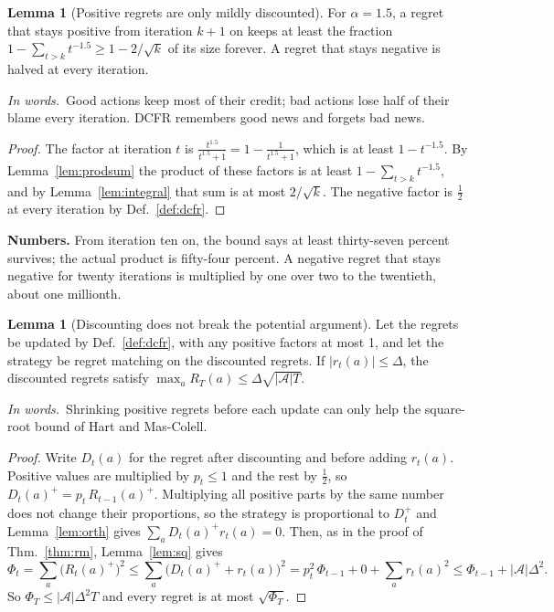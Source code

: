 \documentclass[11pt]{article}
\theoremstyle{definition}
\newtheorem{lemma}[definition]{Lemma}
\newcommand{\inwords}{\par\smallskip\noindent\textit{In words.}\ }
\newcommand{\Def}[1]{Def.~\ref{#1}}\newcommand{\Lem}[1]{Lemma~\ref{#1}}\newcommand{\Thm}[1]{Thm.~\ref{#1}}
\begin{document}
\begin{lemma}[Positive regrets are only mildly discounted]\label{lem:retain}
For $\alpha=1.5$, a regret that stays positive from iteration $k+1$ on keeps at least the fraction
$1-\sum_{t>k}t^{-1.5}\ge1-2/\sqrt k$ of its size forever. A regret that stays negative is halved at every iteration.
\inwords Good actions keep most of their credit; bad actions lose half of their blame every iteration. DCFR remembers
good news and forgets bad news.
\end{lemma}
\begin{proof}
The factor at iteration $t$ is $\frac{t^{1.5}}{t^{1.5}+1}=1-\frac1{t^{1.5}+1}$, which is at least $1-t^{-1.5}$. By
\Lem{lem:prodsum} the product of these factors is at least $1-\sum_{t>k}t^{-1.5}$, and by \Lem{lem:integral} that sum is
at most $2/\sqrt k$. The negative factor is $\tfrac12$ at every iteration by \Def{def:dcfr}.
\end{proof}
\textbf{Numbers.} From iteration ten on, the bound says at least thirty-seven percent survives; the actual product is
fifty-four percent. A negative regret that stays negative for twenty iterations is multiplied by one over two to the
twentieth, about one millionth.

\begin{lemma}[Discounting does not break the potential argument]\label{lem:dpot}
Let the regrets be updated by \Def{def:dcfr}, with any positive factors at most 1, and let the strategy be regret matching
on the discounted regrets. If $|r_t(a)|\le\Delta$, the discounted regrets satisfy $\max_aR_T(a)\le\Delta\sqrt{|\mathcal A|T}$.
\inwords Shrinking positive regrets before each update can only help the square-root bound of Hart and Mas-Colell.
\end{lemma}
\begin{proof}
Write $D_t(a)$ for the regret after discounting and before adding $r_t(a)$. Positive values are multiplied by $p_t\le1$
and the rest by $\tfrac12$, so $D_t(a)^+=p_t\,R_{t-1}(a)^+$. Multiplying all positive parts by the same number does not
change their proportions, so the strategy is proportional to $D_t^+$ and \Lem{lem:orth} gives $\sum_aD_t(a)^+r_t(a)=0$. Then,
as in the proof of \Thm{thm:rm}, \Lem{lem:sq} gives
\[ \Phi_t=\sum_a\big(R_t(a)^+\big)^2\le\sum_a\big(D_t(a)^++r_t(a)\big)^2=p_t^2\,\Phi_{t-1}+0+\sum_ar_t(a)^2\le\Phi_{t-1}+|\mathcal A|\Delta^2. \]
So $\Phi_T\le|\mathcal A|\Delta^2T$ and every regret is at most $\sqrt{\Phi_T}$.
\end{proof}
\end{document}
